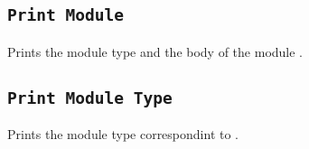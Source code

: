 \subsection{\tt Print Module {\ident}}
Prints the module type and the body of the module {\ident}.

\subsection{\tt Print Module Type {\ident}}
Prints the module type correspondint to {\ident}.



